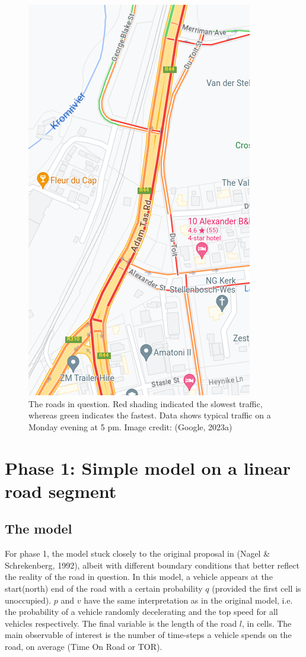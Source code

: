 \documentclass{article}
\begin{document}
\begin{figure}
\includegraphics[scale = 0.75]{images/road.png}
\caption{\label{fig} The roads in question. Red shading indicated the slowest traffic, whereas green indicates the fastest. Data shows typical traffic on a Monday evening at 5 pm. Image credit: (Google, 2023a)}
\end{figure}

\section*{Phase 1: Simple model on a linear road segment}

\subsection*{The model}

For phase 1, the model stuck closely to the original proposal in (Nagel \& Schrekenberg, 1992), albeit with different boundary conditions that better reflect the reality of the road in question. In this model, a vehicle appears at the start(north) end of the road with a certain probability $q$ (provided the first cell is unoccupied). $p$ and $v$ have the same interpretation as in the original model, i.e. the probability of a vehicle randomly decelerating and the top speed for all vehicles respectively. The final variable is the length of the road $l$, in cells. The main observable of interest is the number of time-steps a vehicle spends on the road, on average (Time On Road or TOR).
\end{document}
